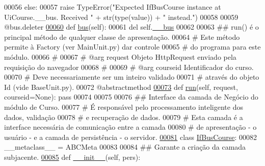 \begin{DoxyCode}
00056         \textcolor{keywordflow}{else}:
00057             \textcolor{keywordflow}{raise} TypeError(\textcolor{stringliteral}{"Expected IfBusCourse instance at UiCourse.\_\_bus. Received "} + str(type(value))
       + \textcolor{stringliteral}{" instead."})
00058 
00059     @bus.deleter
\hypertarget{CourseUnit_8py_source_l00060}{}\hyperlink{classCourse_1_1CourseUnit_1_1IfUiCourse_af9f448bf861939bd039faed2f82de324}{00060}     \textcolor{keyword}{def }\hyperlink{classCourse_1_1CourseUnit_1_1IfUiCourse_a228fc709b99da3a7e6f5020bd07cee03}{bus}(self):
00061         del self.\hyperlink{classCourse_1_1CourseUnit_1_1IfUiCourse_aa961f0720b3e194f935a29f6cd0bbbd5}{\_\_bus}
00062 
00063     \textcolor{comment}{## run() é o principal método de qualquer classe de apresentação.}
00064     \textcolor{comment}{#   Este método permite à Factory (ver MainUnit.py) dar controle}
00065     \textcolor{comment}{#   do programa para este módulo.}
00066     \textcolor{comment}{#}
00067     \textcolor{comment}{#   @arg request    Objeto HttpRequest enviado pela requisição do navegador}
00068     \textcolor{comment}{#}
00069     \textcolor{comment}{#   @arg courseid   Identificador do curso.}
00070     \textcolor{comment}{#                       Deve necessariamente ser um inteiro validado}
00071     \textcolor{comment}{#                       através do objeto Id (vide BaseUnit.py).}
00072     @abstractmethod
\hypertarget{CourseUnit_8py_source_l00073}{}\hyperlink{classCourse_1_1CourseUnit_1_1IfUiCourse_a5b174a0ca1e8fec0bb322d518c6b9cbe}{00073}     \textcolor{keyword}{def }\hyperlink{classCourse_1_1CourseUnit_1_1IfUiCourse_a5b174a0ca1e8fec0bb322d518c6b9cbe}{run}(self, request, courseid=None): \textcolor{keyword}{pass}
00074 
00075 
00076 \textcolor{comment}{## Interface da camada de Negócio do módulo de Curso.}
00077 \textcolor{comment}{#   É responsável pelo processamento inteligente dos dados, validação}
00078 \textcolor{comment}{# e recuperação de dados.}
00079 \textcolor{comment}{#   Esta camada é a interface necessária de comunicação entre a camada}
00080 \textcolor{comment}{# de apresentação - o usuário - e a camada de persistência - o servidor.}
\hypertarget{CourseUnit_8py_source_l00081}{}\hyperlink{classCourse_1_1CourseUnit_1_1IfBusCourse}{00081} \textcolor{keyword}{class }\hyperlink{classCourse_1_1CourseUnit_1_1IfBusCourse}{IfBusCourse}:
00082     \_\_metaclass\_\_ = ABCMeta
00083 
00084     \textcolor{comment}{## Garante a criação da camada subjacente.}
\hypertarget{CourseUnit_8py_source_l00085}{}\hyperlink{classCourse_1_1CourseUnit_1_1IfBusCourse_a8bcb71202e7d221f7a8cc4265f09158e}{00085}     \textcolor{keyword}{def }\hyperlink{classCourse_1_1CourseUnit_1_1IfBusCourse_a8bcb71202e7d221f7a8cc4265f09158e}{\_\_init\_\_}(self, pers):

\end{DoxyCode}
